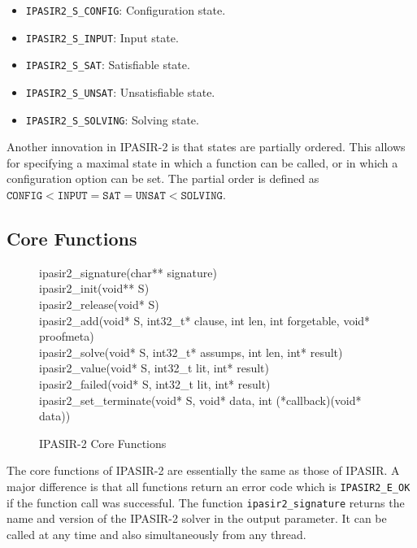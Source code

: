 \documentclass[sat]{iosart2x}
\begin{document}
\begin{itemize}
    \item \texttt{IPASIR2\_S\_CONFIG}: Configuration state.
    \item \texttt{IPASIR2\_S\_INPUT}: Input state.
    \item \texttt{IPASIR2\_S\_SAT}: Satisfiable state.
    \item \texttt{IPASIR2\_S\_UNSAT}: Unsatisfiable state.
    \item \texttt{IPASIR2\_S\_SOLVING}: Solving state.
\end{itemize}

Another innovation in IPASIR-2 is that states are partially ordered.
This allows for specifying a maximal state in which a function can be called, or in which a configuration option can be set.
The partial order is defined as $\mathtt{CONFIG < INPUT = SAT = UNSAT < SOLVING}$.

\subsection{Core Functions}

\begin{figure}[t]
    \tt\raggedright
    ipasir2\_signature(char** signature)\\[1ex]
    ipasir2\_init(void** S)\\
    ipasir2\_release(void* S)\\[1ex]
    ipasir2\_add(void* S, int32\_t* clause, int len, int forgetable, void* proofmeta)\\
    ipasir2\_solve(void* S, int32\_t* assumps, int len, int* result)\\
    ipasir2\_value(void* S, int32\_t lit, int* result)\\
    ipasir2\_failed(void* S, int32\_t lit, int* result)\\[1ex]
    ipasir2\_set\_terminate(void* S, void* data, int (*callback)(void* data))
    \caption{IPASIR-2 Core Functions}
\end{figure}

The core functions of IPASIR-2 are essentially the same as those of IPASIR.
A major difference is that all functions return an error code which is \texttt{IPASIR2\_E\_OK} if the function call was successful.
The function \texttt{ipasir2\_signature} returns the name and version of the IPASIR-2 solver in the output parameter.
It can be called at any time and also simultaneously from any thread.
\end{document}
